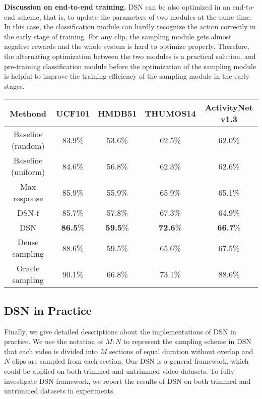 \documentclass[journal]{IEEEtran}
\begin{document}
{\bf Discussion on end-to-end training.}
DSN can be also optimized in an end-to-end scheme, that is, to update the parameters of two modules at the same time.
In this case, the classification module can hardly recognize the action correctly in the early stage of training. For any clip, the sampling module gets almost negative rewards and the whole system is hard to optimize properly.
Therefore, the alternating optimization between the two modules is a practical solution, and pre-training classification module before the optimization of the sampling module is helpful to improve the training efficiency of the sampling module in the early stages.

\begin{table*}[t]
\centering
\caption{{\bf Study on the DSN framework.} We list some competitive methods to demonstrate the effectiveness of DSN. The specific evaluation metric is described in section~\ref{subec:datasets}. For UCF101 and HMDB51, the results are reported on split1. $M:N$ is set as $1:3$ for training on trimmed datasets and $6:3$ on untrimmed datasets. The testing setting is the same with training.}
\begin{tabular}{c|c|c|c|c}
\toprule[2pt]
Methond & UCF101 & HMDB51  & THUMOS14 & ActivityNet v1.3\\
\hline
Baseline (random) & 83.9\% & 53.6\% & 62.5\% & 62.0\%\\
Baseline (uniform) & 84.6\% & 56.8\% & 62.3\% & 62.6\%\\
Max response & 85.9\% & 55.9\% & 65.9\% & 65.1\%\\
\hline

DSN-f & 85.7\% & 57.8\% & 67.3\% & 64.9\%\\
DSN & \textbf{86.5}\% & \textbf{59.5}\% & \textbf{72.6}\% & \textbf{66.7}\%\\
\hline
Dense sampling & 88.6\% & 59.5\% & 65.6\% & 67.5\% \\
Oracle sampling & 90.1\% & 66.8\% & 73.1\% & 88.6\%\\
\toprule[2pt]
\end{tabular}
\label{tab:config_cmp}
\end{table*}

\subsection{DSN in Practice}
\label{sec:inference}
Finally, we give detailed descriptions about the implementations of DSN in practice. We use the notation of $ M: N $ to represent the sampling scheme in DSN that each video is divided into $ M $ sections of equal duration without overlap and $N$ clips are sampled from each section. Our DSN is a general framework, which could be applied on both trimmed and untrimmed video datasets. To fully investigate DSN framework, we report the results of DSN on both trimmed and untrimmed datasets in experiments.
\end{document}
